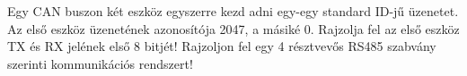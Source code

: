 \begin{example}

Egy CAN buszon két eszköz egyszerre kezd adni egy-egy standard ID-jű üzenetet. Az első eszköz üzenetének azonosítója 2047, a másiké 0. Rajzolja fel az első eszköz TX és RX jelének első 8 bitjét! Rajzoljon fel egy 4 résztvevős RS485 szabvány szerinti kommunikációs rendszert!

\tcbline
\vspace{1mm}

\solution

\end{example}